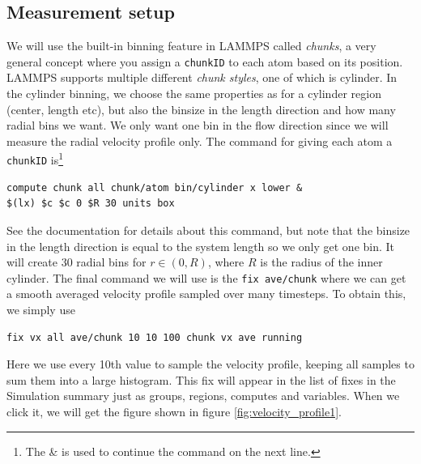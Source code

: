 \documentclass[12pt,a4paper,final]{iopart}
\newcommand{\code}[1]{\colorbox{light-gray}{\color{RawSienna}\texttt{#1}}}
\begin{document}
\subsection{Measurement setup}
We will use the built-in binning feature in LAMMPS called \textit{chunks}, a very general concept where you assign a \code{chunkID} to each atom
based on its position. LAMMPS supports multiple different \textit{chunk styles}, one of which is cylinder.
In the cylinder binning, we choose the same properties as for a cylinder region (center, length etc), but also the binsize in the length direction and how many radial bins we want.
We only want one bin in the flow direction since we will measure the radial velocity profile only.
The command for giving each atom a \code{chunkID} is\footnote{The \& is used to continue the command on the next line.}
\begin{lstlisting}
compute chunk all chunk/atom bin/cylinder x lower &
$(lx) $c $c 0 $R 30 units box
\end{lstlisting}
See the documentation for details about this command, but note that the binsize in the length direction is equal to the system length so we only get one bin.
It will create 30 radial bins for $r\in (0, R)$, where $R$ is the radius of the inner cylinder.
The final command we will use is the \code{fix ave/chunk} where we can get a smooth averaged velocity profile sampled over many timesteps.
To obtain this, we simply use
\begin{lstlisting}
fix vx all ave/chunk 10 10 100 chunk vx ave running
\end{lstlisting}
Here we use every 10th value to sample the velocity profile, keeping all samples to sum them into a large histogram.
This fix will appear in the list of fixes in the Simulation summary just as groups, regions, computes and variables.
When we click it, we will get the figure shown in figure \ref{fig:velocity_profile1}.
\end{document}
